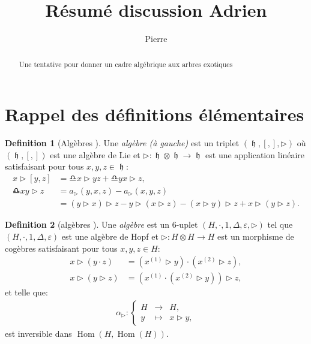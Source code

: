 \documentclass[french]{article}
\theoremstyle{definition}
\newtheorem{defi}{Definition}[section]
\theoremstyle{plain}
\newcommand{\e}{\varepsilon}
\DeclareMathOperator{\h}{\mathfrak{h}}
\DeclareMathOperator{\Hom}{Hom}
\begin{document}
\title{Résumé discussion Adrien }\author{Pierre }
\maketitle

\begin{abstract}
	Une tentative pour donner un cadre algébrique aux arbres exotiques
\end{abstract}

\section{Rappel des définitions élémentaires}

	\begin{defi}[Algèbres \PL{}]\label{defi:LPL}
	Une \emph{algèbre \PL{} (à gauche)} est un triplet $(\h, [,], \rhd)$ où $(\h,[,])$ est une algèbre de Lie et $\rhd:\h\otimes\h \rightarrow \h$ est une application linéaire satisfaisant pour tous $x,y,z\in\h$:
	\begin{align}
		x\rhd [y,z]&=\libra{x\rhd y}{z}+\libra{y}{x\rhd z}, \label{LPL1} \\
		\libra{x}{y}\rhd z&=a_{\rhd}(y,x,z)-a_{\rhd}(x,y,z) \label{LPL2} \\
		&=(y\rhd x)\rhd z-y\rhd(x\rhd z)-(x\rhd y)\rhd z+x\rhd(y\rhd z). \nonumber
	\end{align}
\end{defi}

	\begin{defi}[algèbres \PH{}]\label{defi:LPH}
	Une \emph{algèbre \PH{}}  est un 6-uplet $(H,\cdot,1,\Delta,\e,\rhd)$ tel que $(H,\cdot,1,\Delta,\e)$ est une algèbre de Hopf et $\rhd:H\otimes H \rightarrow H$ est un morphisme de cogèbres satisfaisant pour tous $x,y,z\in H$:
	\begin{align}
		x\rhd(y\cdot z)&=\left(x^{(1)}\rhd y\right)\cdot \left(x^{(2)}\rhd z \right), \\
		x\rhd\left( y\rhd z \right)&=\left( x^{(1)}\cdot \left( x^{(2)}\rhd y \right)\right)\rhd z,
	\end{align}
	et telle que:
	\begin{align}
		\alpha_{\rhd}:\left\lbrace\begin{array}{rcl}
			H & \rightarrow & H, \\
			y & \mapsto & x\rhd y,
		\end{array}\right.
	\end{align}
	est inversible dans $\Hom(H,\Hom(H))$.
\end{defi}
\end{document}
